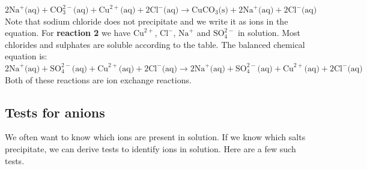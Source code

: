 $2\text{Na}^{+} \text{(aq)} + \text{CO}_{3}^{2-} \text{(aq)} + \text{Cu}^{2+} \text{(aq)} + 2\text{Cl}^{-} \text{(aq)} \to \text{CuCO}_{3} \text{(s)} +  2\text{Na}^{+} \text{(aq)} + 2\text{Cl}^{-} \text{(aq)}$ \\
Note that sodium chloride does not precipitate and we write it as ions in the equation.
For \textbf{reaction 2} we have ${\text{Cu}}^{2+}$, ${\text{Cl}}^{-}$, ${\text{Na}}^{+}$ and $\text{SO}_{4}^{2-}$ in solution. Most chlorides and sulphates are soluble according to the table. The balanced chemical equation is: \\
$2{\text{Na}}^{+} \text{(aq)} + \text{SO}_{4}^{2-} \text{(aq)} + {\text{Cu}}^{2+} \text{(aq)} + 2{\text{Cl}}^{-} \text{(aq)} \to 2{\text{Na}}^{+} \text{(aq)} + \text{SO}_{4}^{2-} \text{(aq)} + {\text{Cu}}^{2+} \text{(aq)} + 2{\text{Cl}}^{-} \text{(aq)} $
Both of these reactions are ion exchange reactions.
\subsection*{Tests for anions}
We often want to know which ions are present in solution. If we know which salts precipitate, we can derive tests to identify ions in solution. Here are a few such tests.
      \label{m38719*uid70}
